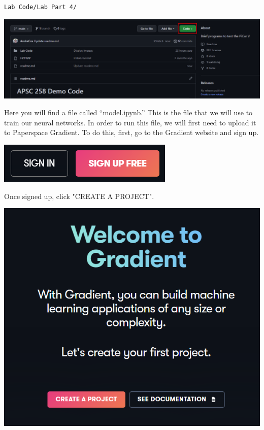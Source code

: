 \documentclass[11pt]{report}
\begin{document}
\begin{verbatim} 
Lab Code/Lab Part 4/
\end{verbatim}

\begin{center}
    \includegraphics[width=\linewidth]{github.png} 
\end{center}



Here you will find a file called “model.ipynb.” This is the file that we will use to train our neural networks. In order to run this file, we will first need to upload it to Paperspace Gradient.
To do this, first, go to the Gradient website and sign up.

\begin{center}
    \includegraphics[scale=0.6]{signinup.png}
\end{center}

Once signed up, click "CREATE A PROJECT".

\begin{center}
    \includegraphics[scale=0.5]{creataproject.png}
\end{center}
\end{document}
